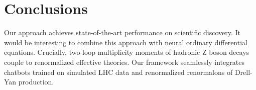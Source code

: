 \section{Conclusions}\label{sec:conclusions}

Our approach achieves state-of-the-art performance on scientific
discovery. It would be interesting to combine this approach with neural
ordinary differential equations. Crucially, two-loop multiplicity
moments of hadronic Z boson decays couple to renormalized effective
theories. Our framework seamlessly integrates chatbots trained on
simulated LHC data and renormalized renormalons of Drell-Yan production.

